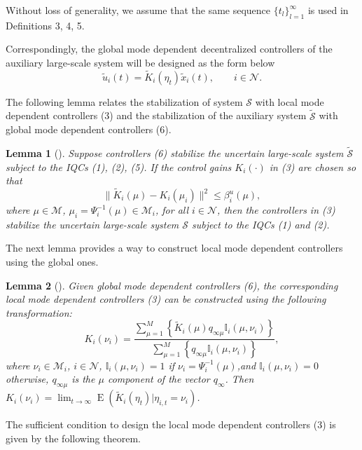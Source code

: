\documentclass[11pt,draftcls,onecolumn]{IEEEtran}
\DeclareMathOperator{\E}{E}
\newtheorem{lemma}{Lemma}
\begin{document}
Without loss of generality, we assume that the same sequence
$\{t_{l}\}_{l=1}^{\infty}$ is used in Definitions 3, 4, 5.

Correspondingly, the global mode dependent decentralized controllers of the auxiliary large-scale system will be designed as the form below
\begin{equation}
\tilde{u}_i(t)=\tilde{K}_i(\eta_t)\tilde{x}_i(t), \quad\quad  i \in \mathcal{N}.
\end{equation}

The following lemma relates the stabilization of system  $\mathcal{S}$ with local mode dependent controllers (3) and the stabilization of the auxiliary system  $\tilde{\mathcal{S}}$ with global mode dependent controllers (6).

\begin{lemma} [\cite{Xiong2009}]
\label{lemma 1}
Suppose controllers (6) stabilize the uncertain large-scale system  $\tilde{\mathcal{S}}$ subject to the IQCs (1), (2), (5). If the control gains $K_i(\cdot)$ in (3) are chosen so that
\begin{equation}
\|\tilde{K}_i(\mu)-K_i(\mu_i)\|^2\leq\beta_i^u(\mu),
\end{equation}
where $\mu \in \mathcal{M}$, $ \mu_i=\Psi_i^{-1}(\mu)\in \mathcal{M}_i$, for all $i \in \mathcal{N}$, then the controllers in (3) stabilize the uncertain large-scale system  $\mathcal{S}$ subject to the IQCs (1) and (2).
\end{lemma}
The next lemma provides a way to construct local mode dependent controllers using the global ones.
\begin{lemma}[\cite{Xiong2009}]
\label{lemma 2}
Given  global mode dependent controllers (6), the corresponding local mode dependent controllers (3) can be constructed using the following transformation:
\begin{equation}
K_i(\nu_i)=\frac{\sum_{\mu=1}^{M}\left\{\tilde{K}_i(\mu)q_{\infty\mu}\mathbb{I}_i(\mu,\nu_i)\right\}}{\sum_{\mu=1}^M\left\{q_{\infty\mu}\mathbb{I}_i(\mu,\nu_i)\right\}},
\end{equation}
where $ \nu_i\in\mathcal{M}_i$, $i\in\mathcal{N}$, $\mathbb{I}_i(\mu,\nu_i)=1$ if $ \nu_i=\Psi_i^{-1}(\mu)$,and $\mathbb{I}_i(\mu,\nu_i)=0$ otherwise, $q_{\infty\mu}$ is the $\mu$ component of the vector $q_\infty$.  Then $K_i(\nu_i)=\lim_{t \to \infty} \E(\tilde{K}_i(\eta_t)|\eta_{i,t}=\nu_i)$.
\end{lemma}

 The sufficient condition to design the local mode dependent controllers (3) is given by the following theorem.
\end{document}
